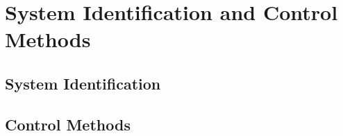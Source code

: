 \section{System Identification and Control Methods}%
\label{sec:sys_iden_and_control_methods}

\subsection{System Identification}%
\label{subsec:sys_iden}

\subsection{Control Methods}%
\label{subsec:control_methods}
